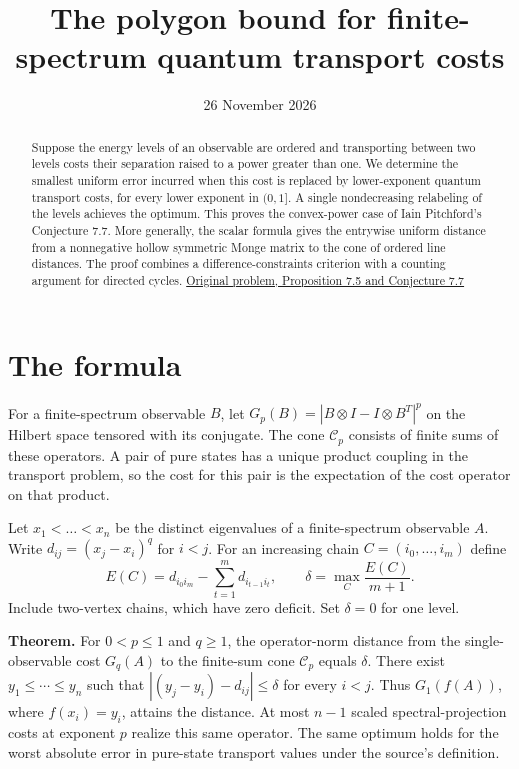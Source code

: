\documentclass[11pt]{article}
\title{The polygon bound for finite-spectrum quantum transport costs}
\date{26 November 2026}
\begin{document}
\maketitle
\begin{abstract}
Suppose the energy levels of an observable are ordered and transporting between two levels costs their separation raised to a power greater than one. We determine the smallest uniform error incurred when this cost is replaced by lower-exponent quantum transport costs, for every lower exponent in $(0,1]$. A single nondecreasing relabeling of the levels achieves the optimum. This proves the convex-power case of Iain Pitchford's Conjecture 7.7. More generally, the scalar formula gives the entrywise uniform distance from a nonnegative hollow symmetric Monge matrix to the cone of ordered line distances. The proof combines a difference-constraints criterion with a counting argument for directed cycles. \href{https://github.com/ipitchford/quantum-transport-cost-cones/blob/270f5dba795ffd73d271bfde959237b730227c5e/manuscript.tex\#L521-L563}{Original problem, Proposition 7.5 and Conjecture 7.7}
\end{abstract}

\section{The formula}

For a finite-spectrum observable $B$, let $G_p(B)=|B\otimes I-I\otimes B^T|^p$ on the Hilbert space tensored with its conjugate. The cone $\mathcal C_p$ consists of finite sums of these operators. A pair of pure states has a unique product coupling in the transport problem, so the cost for this pair is the expectation of the cost operator on that product.

Let $x_1<\dots<x_n$ be the distinct eigenvalues of a finite-spectrum observable $A$. Write $d_{ij}=(x_j-x_i)^q$ for $i<j$. For an increasing chain $C=(i_0,\dots,i_m)$ define
\[
E(C)=d_{i_0i_m}-\sum_{t=1}^m d_{i_{t-1}i_t},\qquad
\delta=\max_C \frac{E(C)}{m+1}.
\]
Include two-vertex chains, which have zero deficit. Set $\delta=0$ for one level.

\textbf{Theorem.} For $0<p\leq 1$ and $q\geq1$, the operator-norm distance from the single-observable cost $G_q(A)$ to the finite-sum cone $\mathcal C_p$ equals $\delta$. There exist $y_1\leq\cdots\leq y_n$ such that $|(y_j-y_i)-d_{ij}|\leq\delta$ for every $i<j$. Thus $G_1(f(A))$, where $f(x_i)=y_i$, attains the distance. At most $n-1$ scaled spectral-projection costs at exponent $p$ realize this same operator. The same optimum holds for the worst absolute error in pure-state transport values under the source's definition.
\end{document}
